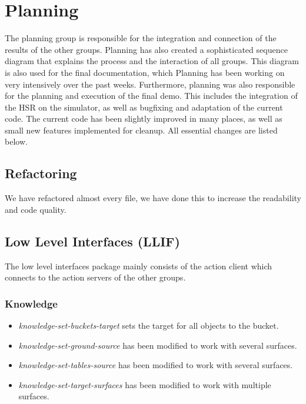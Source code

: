 \documentclass[main.tex]{subfiles}
\begin{document}
	
	\chapter{Planning}
                The planning group is responsible for the integration and connection of the results of the other groups. Planning has also created a sophisticated sequence diagram that explains the process and the interaction of all groups. This diagram is also used for the final documentation, which Planning has been working on very intensively over the past weeks. Furthermore, planning was also responsible for the planning and execution of the final demo. This includes the integration of the HSR on the simulator, as well as bugfixing and adaptation of the current code. The current code has been slightly improved in many places, as well as small new features implemented for cleanup. All essential changes are listed below. 
          
          		\section{Refactoring}
	        	    We have refactored almost every file, we have done this to increase the readability and code quality.   
	        	    
	        	\section{Low Level Interfaces (LLIF)}
	                The low level interfaces package mainly consists of the action client which connects to the action servers of the other groups.
                
               
                \subsection{Knowledge}
	                
				    \begin{itemize}
				      \item \textit{knowledge-set-buckets-target} sets the target for all objects to the bucket.
				       \item \textit{knowledge-set-ground-source} has been modified to work with several surfaces. 
				       \item \textit{knowledge-set-tables-source} has been modified to work with several surfaces. 
				       \item \textit{knowledge-set-target-surfaces} has been modified to work with multiple surfaces.
		
				    \end{itemize} 
                                           
\end{document}
